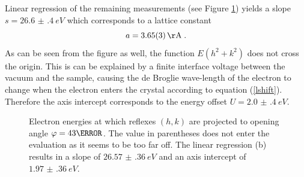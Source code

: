 \documentclass[a4paper]{scrartcl}
\numberwithin{equation}{section}
\numberwithin{figure}{section}
\numberwithin{table}{section}
\newcommand{\eq}[2]{\begin{equation}#1\label{#2}\end{equation}}
\newcommand{\Formel}[1]{(\ref{#1})}
\begin{document}
Linear regression of the remaining measurements (see Figure \ref{fig:rr}) yields a slope $s=\SI{26.6(4)}{eV}$ which corresponds to a lattice constant 
\eq{a=\SI{3.65(3)}{\AA}\;.}{a1}
As can be seen from the figure as well, the function $E(h^2+k^2)$ does not cross the origin. This is can be explained by a finite interface voltage between the vacuum and the sample, causing the de Broglie wave-length of the electron to change when the electron enters the crystal according to equation \Formel{lshift}. Therefore the axis intercept corresponds to the energy offset $U=\SI{2.0(4)}{eV}$.

 \begin{figure}[p] 
 \centering

\hfill
{}

\caption{\small Electron energies at which reflexes $(h,k)$ are projected to opening angle $\varphi=43 \degree$. The value in parentheses does not enter the evaluation as it seems to be too far off. The linear regression (b) results in a slope of $\SI{26.57(36)}{eV}$ and an axis intercept of $\SI{1.97(36)}{eV}$.}
	\label{fig:rr}
\end{figure}
\end{document}
